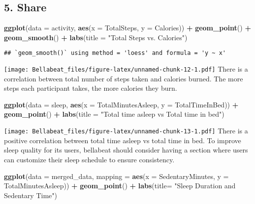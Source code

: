 \documentclass[
]{article}
\newenvironment{Shaded}{\begin{snugshade}}{\end{snugshade}}
\newcommand{\AttributeTok}[1]{\textcolor[rgb]{0.13,0.29,0.53}{#1}}
\newcommand{\FunctionTok}[1]{\textcolor[rgb]{0.13,0.29,0.53}{\textbf{#1}}}
\newcommand{\NormalTok}[1]{#1}
\newcommand{\SpecialCharTok}[1]{\textcolor[rgb]{0.81,0.36,0.00}{\textbf{#1}}}
\newcommand{\StringTok}[1]{\textcolor[rgb]{0.31,0.60,0.02}{#1}}
\begin{document}
\hypertarget{share}{%
\subsection{5. Share}\label{share}}

\begin{Shaded}
\begin{Highlighting}[]
\FunctionTok{ggplot}\NormalTok{(}\AttributeTok{data =}\NormalTok{ activity, }\FunctionTok{aes}\NormalTok{(}\AttributeTok{x =}\NormalTok{ TotalSteps, }\AttributeTok{y =}\NormalTok{ Calories)) }\SpecialCharTok{+} \FunctionTok{geom\_point}\NormalTok{() }\SpecialCharTok{+} \FunctionTok{geom\_smooth}\NormalTok{() }\SpecialCharTok{+} \FunctionTok{labs}\NormalTok{(}\AttributeTok{title =} \StringTok{"Total Steps vs. Calories"}\NormalTok{)}
\end{Highlighting}
\end{Shaded}

\begin{verbatim}
## `geom_smooth()` using method = 'loess' and formula = 'y ~ x'
\end{verbatim}

\texttt{[image: Bellabeat\_files/figure-latex/unnamed-chunk-12-1.pdf]}
There is a correlation between total number of steps taken and calories
burned. The more steps each participant takes, the more calories they
burn.

\begin{Shaded}
\begin{Highlighting}[]
\FunctionTok{ggplot}\NormalTok{(}\AttributeTok{data =}\NormalTok{ sleep, }\FunctionTok{aes}\NormalTok{(}\AttributeTok{x =}\NormalTok{ TotalMinutesAsleep, }\AttributeTok{y =}\NormalTok{ TotalTimeInBed)) }\SpecialCharTok{+} \FunctionTok{geom\_point}\NormalTok{() }\SpecialCharTok{+} \FunctionTok{labs}\NormalTok{(}\AttributeTok{title =} \StringTok{"Total time asleep vs Total time in bed"}\NormalTok{)}
\end{Highlighting}
\end{Shaded}

\texttt{[image: Bellabeat\_files/figure-latex/unnamed-chunk-13-1.pdf]}
There is a positive correlation between total time asleep vs total time
in bed. To improve sleep quality for its users, bellabeat should
consider having a section where users can customize their sleep schedule
to ensure consistency.

\begin{Shaded}
\begin{Highlighting}[]
\FunctionTok{ggplot}\NormalTok{(}\AttributeTok{data =}\NormalTok{ merged\_data, }\AttributeTok{mapping =} \FunctionTok{aes}\NormalTok{(}\AttributeTok{x =}\NormalTok{ SedentaryMinutes, }\AttributeTok{y =}\NormalTok{ TotalMinutesAsleep)) }\SpecialCharTok{+} 
  \FunctionTok{geom\_point}\NormalTok{() }\SpecialCharTok{+} \FunctionTok{labs}\NormalTok{(}\AttributeTok{title=} \StringTok{"Sleep Duration and Sedentary Time"}\NormalTok{)}
\end{Highlighting}
\end{Shaded}
\end{document}
